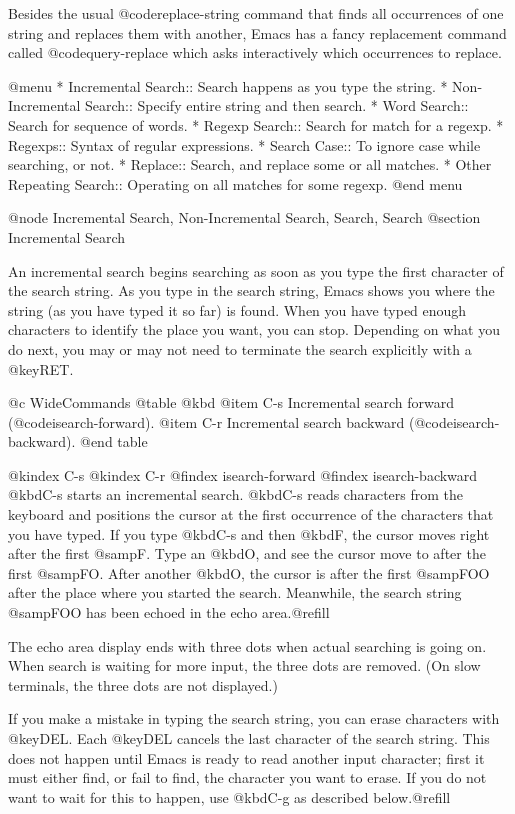 {{{{  Besides the usual @code{replace-string} command that finds all
occurrences of one string and replaces them with another, Emacs has a fancy
replacement command called @code{query-replace} which asks interactively
which occurrences to replace.

@menu
* Incremental Search::     Search happens as you type the string.
* Non-Incremental Search::  Specify entire string and then search.
* Word Search::            Search for sequence of words.
* Regexp Search::          Search for match for a regexp.
* Regexps::                Syntax of regular expressions.
* Search Case::            To ignore case while searching, or not.
* Replace::                Search, and replace some or all matches.
* Other Repeating Search:: Operating on all matches for some regexp.
@end menu

@node Incremental Search, Non-Incremental Search, Search, Search
@section Incremental Search

  An incremental search begins searching as soon as you type the first
character of the search string.  As you type in the search string, Emacs
shows you where the string (as you have typed it so far) is found.
When you have typed enough characters to identify the place you want, you
can stop.  Depending on what you do next, you may or may not need to
terminate the search explicitly with a @key{RET}.

@c WideCommands
@table @kbd
@item C-s
Incremental search forward (@code{isearch-forward}).
@item C-r
Incremental search backward (@code{isearch-backward}).
@end table

@kindex C-s
@kindex C-r
@findex isearch-forward
@findex isearch-backward
  @kbd{C-s} starts an incremental search.  @kbd{C-s} reads characters from
the keyboard and positions the cursor at the first occurrence of the
characters that you have typed.  If you type @kbd{C-s} and then @kbd{F},
the cursor moves right after the first @samp{F}.  Type an @kbd{O}, and see
the cursor move to after the first @samp{FO}.  After another @kbd{O}, the
cursor is after the first @samp{FOO} after the place where you started the
search.  Meanwhile, the search string @samp{FOO} has been echoed in the
echo area.@refill

  The echo area display ends with three dots when actual searching is going
on.  When search is waiting for more input, the three dots are removed.
(On slow terminals, the three dots are not displayed.)

  If you make a mistake in typing the search string, you can erase
characters with @key{DEL}.  Each @key{DEL} cancels the last character of the
search string.  This does not happen until Emacs is ready to read another
input character; first it must either find, or fail to find, the character
you want to erase.  If you do not want to wait for this to happen, use
@kbd{C-g} as described below.@refill

}}}}
